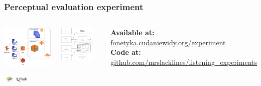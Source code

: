 \documentclass[a4paper,9pt]{beamer}
\theoremstyle{mytheoremstyle}
\begin{document}
\begin{frame}
\frametitle{Perceptual evaluation experiment}
\begin{columns}
\begin{column}{0.5\textwidth}
\begin{center}
  \includegraphics[width=\textwidth]{res/experiment_infra}
\end{center}
  \includegraphics[width=0.5\textwidth]{res/experiment_stack}
\end{column}
  \includegraphics[width=0.8\textwidth]{res/experiment_diagram}
  \scriptsize{
\begin{exampleblock}{}
\textbf{Available at:}\\
\url{fonetyka.cudaniewidy.org/experiment}\\
\textbf{Code at:}\\
\url{github.com/mrslacklines/listening_experiments}
\end{exampleblock}
}
\end{columns}
\end{frame}
\end{document}
